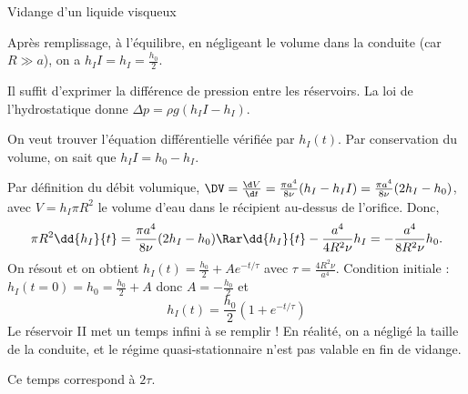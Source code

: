 \begin{exo}[PC][3][oral]{Vidange d'un liquide visqueux}
{    Après remplissage, à l'équilibre, en négligeant le volume dans la conduite (car $R\gg a$), on a $h_II=h_I = \frac{h_0}{2}$.

    Il suffit d'exprimer la différence de pression entre les réservoirs. La loi de l'hydrostatique donne $\Delta p = \rho g (h_II-h_I)$.

     On veut trouver l'équation différentielle vérifiée par $h_I(t)$. Par conservation du volume, on sait que $h_II = h_0-h_I$.

    Par définition du débit volumique,
    $
    \DV = \frac{\d V}{\d t} = \frac{\pi a^4}{8\nu} (h_I-h_II) = \frac{\pi a^4}{8\nu} (2h_I-h_0)
    $,
    avec $V = h_I \pi R^2$ le volume d’eau dans le récipient au-dessus de l’orifice.
    Donc,
    $$
    \pi R^2 \dd{h_I}{t} =  \frac{\pi a^4}{8\nu} (2h_I-h_0) \Rar  \dd{h_I}{t} - \frac{a^4}{4R^2\nu} h_I = -\frac{a^4}{8R^2\nu}h_0.
    $$
    On résout et on obtient $h_I(t) = \frac{h_0}{2} + A e^{-t/\tau}$ avec $\tau = \frac{4R^2\nu}{a^4}$. Condition initiale : $h_I(t=0) = h_0 = \frac{h_0}{2} + A$ donc $A=-\frac{h_0}{2}$ et
    $$
    h_I(t) = \frac{h_0}{2}(1+e^{-t/\tau})
    $$
    Le réservoir II met un temps infini à se remplir ! En réalité, on a négligé la taille de la conduite, et le régime quasi-stationnaire n'est pas valable en fin de vidange.

    Ce temps correspond à $2\tau$.
}
\end{exo}

